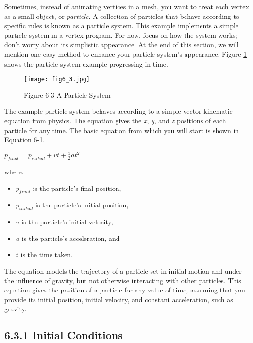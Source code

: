 \documentclass[../main.tex]{subfiles}
\begin{document}
Sometimes, instead of animating vertices in a mesh, you want to treat each vertex as a small object, or \textit{particle}. A collection of particles that behave according to specific rules is known as a particle system. This example implements a simple particle system in a vertex program. For now, focus on how the system works; don't worry about its simplistic appearance. At the end of this section, we will mention one easy method to enhance your particle system's appearance. Figure \ref{fig:6-3} shows the particle system example progressing in time.

\begin{figure}
    \centering
    \texttt{[image: fig6\_3.jpg]}
    \caption{Figure 6-3 A Particle System}
    \label{fig:6-3}
\end{figure}

The example particle system behaves according to a simple vector kinematic equation from physics. The equation gives the \textit{x}, \textit{y}, and \textit{z} positions of each particle for any time. The basic equation from which you will start is shown in Equation 6-1.

\FloatBarrier
\begin{equationcaption}
$
p_{final} = p_{initial} + vt + \frac{1}{2}at^2
$
\caption{Equation 6-1 Particle Trajectory}
\end{equationcaption}
\FloatBarrier

where:

\begin{itemize}
\item $p_{final}$ is the particle's final position,
\item $p_{initial}$ is the particle's initial position,
\item $v$ is the particle's initial velocity,
\item $a$ is the particle's acceleration, and
\item $t$ is the time taken.
\end{itemize}

The equation models the trajectory of a particle set in initial motion and under the influence of gravity, but not otherwise interacting with other particles. This equation gives the position of a particle for any value of time, assuming that you provide its initial position, initial velocity, and constant acceleration, such as gravity.

\subsection{6.3.1 Initial Conditions}
\end{document}
